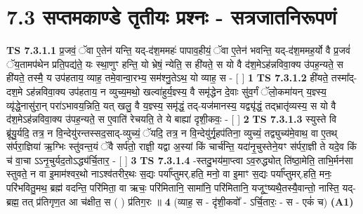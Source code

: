 \documentclass[17pt]{extarticle}
\begin{document}
     \section*{ 7.3      सप्तमकाण्डे तृतीयः प्रश्नः - सत्रजातनिरूपणं }
                                        \textbf{ TS 7.3.1.1} \newline
                  प्र॒जवं॒ ॅवा ए॒तेन॑ यन्ति॒ यद्-द॑श॒ममहः॑ पापाव॒हीयं॒ ॅवा ए॒तेन॑ भवन्ति॒ यद्-द॑श॒ममह॒र्यो वै प्र॒जवं॑ ॅय॒तामप॑थेन प्रति॒पद्य॑ते॒ यः स्था॒णुꣳ हन्ति॒ यो भ्रेषं॒ न्येति॒ स ही॑यते॒ स यो वै द॑श॒मेऽह॑न्नविवा॒क्य उ॑पह॒न्यते॒ स ही॑यते॒ तस्मै॒ य उप॑हताय॒ व्याह॒ तमे॒वान्वा॒रभ्य॒ सम॑श्नु॒तेऽथ॒ यो व्याह॒ स - [  ] \textbf{  1} \newline
                  \newline
                                \textbf{ TS 7.3.1.2} \newline
                  ही॑यते॒ तस्मा᳚द्-दश॒मे ऽह॑न्नविवा॒क्य उप॑हताय॒ न व्युच्य॒मथो॒ खल्वा॑हुर्य॒ज्ञ्स्य॒ वै समृ॑द्धेन दे॒वाः सु॑व॒र्गं ॅलो॒कमा॑यन् य॒ज्ञ्स्य॒ व्यृ॑द्धे॒नासु॑रा॒न् परा॑ऽभावय॒न्निति॒ यत् खलु॒ वै य॒ज्ञ्स्य॒ समृ॑द्धं॒ तद्-यज॑मानस्य॒ यद्व्यृ॑द्धं॒ तद्भ्रातृ॑व्यस्य॒ स यो वै द॑श॒मेऽह॑न्नविवा॒क्य उ॑पह॒न्यते॒ स ए॒वाति॑ रेचयति॒ ते ये बाह्या॑ दृशी॒कवः॒ - [  ] \textbf{  2} \newline
                  \newline
                                \textbf{ TS 7.3.1.3} \newline
                  स्युस्ते वि ब्रू॑यु॒र्यदि॒ तत्र॒ न वि॒न्देयु॑रन्तस्सद॒साद्-व्युच्यं॒ ॅयदि॒ तत्र॒ न वि॒न्देयु॑र्गृ॒हप॑तिना॒ व्युच्यं॒ तद्व्युच्य॑मे॒वाथ॒ वा ए॒तथ् स॑र्परा॒ज्ञिया॑ ऋ॒ग्भिः स्तु॑वन्त॒यं ॅवै सर्प॑तो॒ राज्ञी॒ यद्वा अ॒स्यां किं चार्च॑न्ति॒ यदा॑नृ॒चुस्तेने॒यꣳ स॑र्परा॒ज्ञी ते यदे॒व किं च॑ वा॒चा ऽऽनृ॒चुर्यद॒तोऽद्ध्य॑र्चि॒तार॒ - [  ] \textbf{  3} \newline
                  \newline
                                \textbf{ TS 7.3.1.4} \newline
                  -स्तदु॒भय॑मा॒प्त्वा ऽव॒रुद्ध्योत् ति॑ष्ठा॒मेति॒ ताभि॒र्मन॑सा स्तुवते॒ न वा इ॒माम॑श्वर॒थो नाऽश्व॑तरीर॒थः स॒द्यः पर्या᳚प्तुमर्.हति॒ मनो॒ वा इ॒माꣳ स॒द्यः पर्या᳚प्तुमर्.हति॒ मनः॒ परि॑भवितु॒मथ॒ ब्रह्म॑ वदन्ति॒ परि॑मिता॒ वा ऋचः॒ परि॑मितानि॒ सामा॑नि॒ परि॑मितानि॒ यजूꣳ॒॒ष्यथै॒तस्यै॒वान्तो॒ नास्ति॒ यद्-ब्रह्म॒ तत् प्र॑तिगृण॒त आ च॑क्षीत॒ स ( ) प्र॑तिग॒रः ॥ \textbf{  4} \newline
                  \newline
                      (व्याह॒ स - दृ॑शी॒कवो᳚ - ऽर्चि॒तारः॒ - स - एकं॑ च)  \textbf{(A1)} \newline \newline
\end{document}
